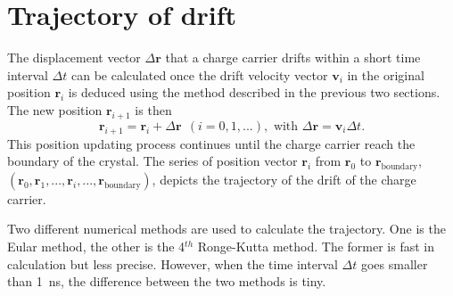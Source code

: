 \section{Trajectory of drift}
\label{sec:pss:trj}
The displacement vector $\Delta \mathbf{r}$ that a charge carrier drifts within a short time interval $\Delta t$ can be calculated once the drift velocity vector $\mathbf{v}_{i}$ in the original position $\mathbf{r}_{i}$ is deduced using the method described in the previous two sections. The new position $\mathbf{r}_{i+1}$ is then
\begin{equation}
\label{eq:pss:pos}
\mathbf{r}_{i+1} = \mathbf{r}_{i} + \Delta \mathbf{r} \ \ (i=0,1,...), \text{ with } \Delta \mathbf{r} = \mathbf{v}_{i} \Delta t.
\end{equation}
This position updating process continues until the charge carrier reach the boundary of the crystal. The series of position vector $\mathbf{r}_{i}$ from $\mathbf{r}_{0}$ to $\mathbf{r}_{\text{boundary}}$, $(\mathbf{r}_{0}, \mathbf{r}_{1}, ..., \mathbf{r}_{i}, ..., \mathbf{r}_{\text{boundary}})$, depicts the trajectory of the drift of the charge carrier.

Two different numerical methods are used to calculate the trajectory. One is the Eular method, the other is the 4$^{th}$ Ronge-Kutta method. The former is fast in calculation but less precise. However, when the time interval $\Delta t$ goes smaller than 1~ns, the difference between the two methods is tiny.

